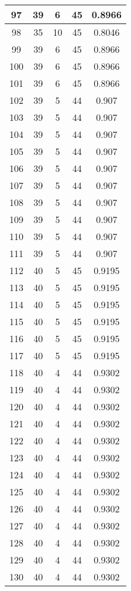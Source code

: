 \documentclass[letterpaper, 12pt]{article}
\begin{document}
\begin{longtable}{|c|c|c|c|c|}
\hline
97 & 39 & 6 & 45 & 0.8966 \\
\hline
98 & 35 & 10 & 45 & 0.8046 \\
\hline
99 & 39 & 6 & 45 & 0.8966 \\
\hline
100 & 39 & 6 & 45 & 0.8966 \\
\hline
101 & 39 & 6 & 45 & 0.8966 \\
\hline
102 & 39 & 5 & 44 & 0.907 \\
\hline
103 & 39 & 5 & 44 & 0.907 \\
\hline
104 & 39 & 5 & 44 & 0.907 \\
\hline
105 & 39 & 5 & 44 & 0.907 \\
\hline
106 & 39 & 5 & 44 & 0.907 \\
\hline
107 & 39 & 5 & 44 & 0.907 \\
\hline
108 & 39 & 5 & 44 & 0.907 \\
\hline
109 & 39 & 5 & 44 & 0.907 \\
\hline
110 & 39 & 5 & 44 & 0.907 \\
\hline
111 & 39 & 5 & 44 & 0.907 \\
\hline
112 & 40 & 5 & 45 & 0.9195 \\
\hline
113 & 40 & 5 & 45 & 0.9195 \\
\hline
114 & 40 & 5 & 45 & 0.9195 \\
\hline
115 & 40 & 5 & 45 & 0.9195 \\
\hline
116 & 40 & 5 & 45 & 0.9195 \\
\hline
117 & 40 & 5 & 45 & 0.9195 \\
\hline
118 & 40 & 4 & 44 & 0.9302 \\
\hline
119 & 40 & 4 & 44 & 0.9302 \\
\hline
120 & 40 & 4 & 44 & 0.9302 \\
\hline
121 & 40 & 4 & 44 & 0.9302 \\
\hline
122 & 40 & 4 & 44 & 0.9302 \\
\hline
123 & 40 & 4 & 44 & 0.9302 \\
\hline
124 & 40 & 4 & 44 & 0.9302 \\
\hline
125 & 40 & 4 & 44 & 0.9302 \\
\hline
126 & 40 & 4 & 44 & 0.9302 \\
\hline
127 & 40 & 4 & 44 & 0.9302 \\
\hline
128 & 40 & 4 & 44 & 0.9302 \\
\hline
129 & 40 & 4 & 44 & 0.9302 \\
\hline
130 & 40 & 4 & 44 & 0.9302 \\

\end{longtable}
\end{document}
